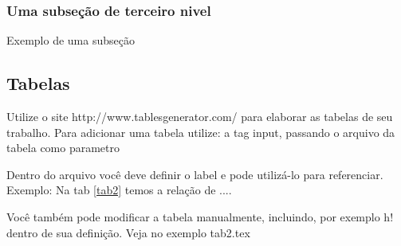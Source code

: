 \documentclass[	DIV=calc,%
							paper=a4,%
							fontsize=12pt,%
							onecolumn]{scrartcl}	 					%
\begin{document}
\subsubsection{Uma subseção de terceiro nivel}

Exemplo de uma subseção

\subsection{Tabelas}

Utilize o site http://www.tablesgenerator.com/ para elaborar as tabelas de seu trabalho.
Para adicionar uma tabela utilize: a tag input, passando o arquivo da tabela como parametro



Dentro do arquivo você deve definir o label e pode utilizá-lo para referenciar. Exemplo:
Na tab \ref{tab2} temos a relação de ....


Você também pode modificar a tabela manualmente, incluindo, por exemplo h! dentro de sua definição. Veja no exemplo tab2.tex



\end{document}
